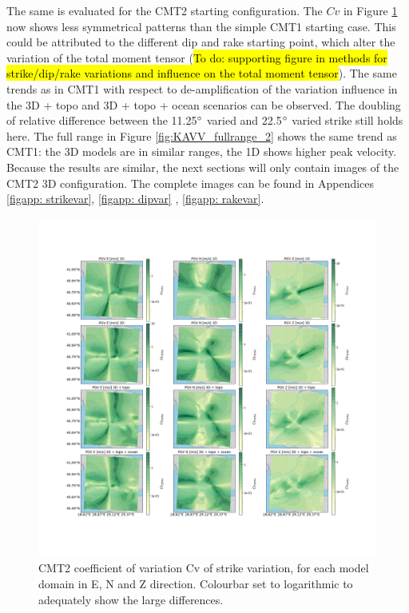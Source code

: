 \documentclass[../Text/00main.tex]{subfiles}
\begin{document}
The same is evaluated for the CMT2 starting configuration. The $Cv$ in Figure \ref{fig:cmt2sigm} now shows less symmetrical patterns than the simple CMT1 starting case. This could be attributed to the different dip and rake starting point, which alter the variation of the total moment tensor (\hl{To do: supporting figure in methods for strike/dip/rake variations and influence on the total moment tensor}). The same trends as in CMT1 with respect to de-amplification of the variation influence in the 3D + topo and 3D + topo + ocean scenarios can be observed. The doubling of relative difference between the 11.25$\degree$ varied and 22.5$\degree$ varied strike still holds here. The full range in Figure \ref{fig:KAVV_fullrange_2} shows the same trend as CMT1: the 3D models are in similar ranges, the 1D shows higher peak velocity. Because the results are similar, the next sections will only contain images of the CMT2 3D configuration. The complete images can be found in Appendices \ref{figapp: strikevar}, \ref{figapp: dipvar} , \ref{figapp: rakevar}.


\begin{figure}[!htp]
    \centering
    \includegraphics[width=1\linewidth,trim = 2cm 5cm 1cm 5cm, clip]{images_results/strike_variation_sigma_sc2.png}
    \caption{CMT2 coefficient of variation $\text{Cv}$ of strike variation, for each model domain in E, N and Z direction. Colourbar set to logarithmic to adequately show the large differences.}
    \label{fig:cmt2sigm}
\end{figure}
\end{document}
